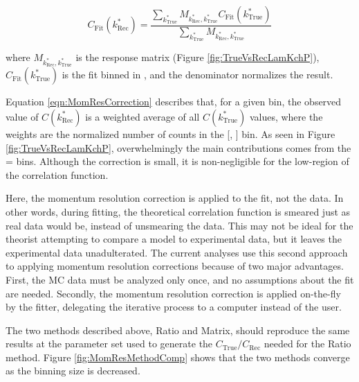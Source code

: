 \documentclass[../AnalysisNoteJBuxton.tex]{subfiles}
\begin{document}
\begin{equation}
  C_{\mathrm{Fit}}(k^{*}_{\mathrm{Rec}}) = \dfrac{\sum\limits_{k^{*}_{\mathrm{True}}}M_{k^{*}_{\mathrm{Rec}},k^{*}_{\mathrm{True}}}C_{\mathrm{Fit}}(k^{*}_{\mathrm{True}})}{\sum\limits_{k^{*}_{\mathrm{True}}}M_{k^{*}_{\mathrm{Rec}},k^{*}_{\mathrm{True}}}}
\label{eqn:MomResCorrection}
\end{equation}

where $M_{k^{*}_{\mathrm{Rec}},k^{*}_{\mathrm{True}}}$ is the response matrix (Figure \ref{fig:TrueVsRecLamKchP}), $C_{\mathrm{Fit}}(k^{*}_{\mathrm{True}})$ is the fit binned in \ktrue, and the denominator normalizes the result.

Equation \ref{eqn:MomResCorrection} describes that, for a given \krec bin, the observed value of $C(k^{*}_{\mathrm{Rec}})$ is a weighted average of all $C(k^{*}_{\mathrm{True}})$ values, where the weights are the normalized number of counts in the [\krec, \ktrue] bin.
As seen in Figure \ref{fig:TrueVsRecLamKchP}, overwhelmingly the main contributions comes from the \krec = \ktrue bins.
Although the correction is small, it is non-negligible for the low-\kstar region of the correlation function.

Here, the momentum resolution correction is applied to the fit, not the data.
In other words, during fitting, the theoretical correlation function is smeared just as real data would be, instead of unsmearing the data.
This may not be ideal for the theorist attempting to compare a model to experimental data, but it leaves the experimental data unadulterated.
The current analyses use this second approach to applying momentum resolution corrections because of two major advantages.  First, the MC data must be analyzed only once, and no assumptions about the fit are needed.  Secondly, the momentum resolution correction is applied on-the-fly by the fitter, delegating the iterative process to a computer instead of the user.

The two methods described above, Ratio and Matrix, should reproduce the same results at the parameter set used to generate the $C_{\mathrm{True}}/C_{\mathrm{Rec}}$ needed for the Ratio method.  Figure \ref{fig:MomResMethodComp} shows that the two methods converge as the binning size is decreased.
\end{document}
